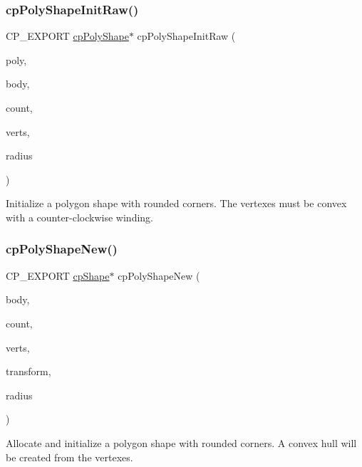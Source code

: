 \subsubsection{\texorpdfstring{cp\+Poly\+Shape\+Init\+Raw()}{cpPolyShapeInitRaw()}}
{\footnotesize\ttfamily C\+P\+\_\+\+E\+X\+P\+O\+RT \mbox{\hyperlink{structcp_poly_shape}{cp\+Poly\+Shape}}$\ast$ cp\+Poly\+Shape\+Init\+Raw (\begin{DoxyParamCaption}\item[{\mbox{\hyperlink{structcp_poly_shape}{cp\+Poly\+Shape}} $\ast$}]{poly,  }\item[{\mbox{\hyperlink{structcp_body}{cp\+Body}} $\ast$}]{body,  }\item[{int}]{count,  }\item[{const \mbox{\hyperlink{structcp_vect}{cp\+Vect}} $\ast$}]{verts,  }\item[{\mbox{\hyperlink{group__basic_types_gac1ed65573e035bf892505768c852d8d3}{cp\+Float}}}]{radius }\end{DoxyParamCaption})}

Initialize a polygon shape with rounded corners. The vertexes must be convex with a counter-\/clockwise winding. \mbox{\label{group__cp_poly_shape_ga4c25992d3d90362168b2681acd7d7d62}} 
\subsubsection{\texorpdfstring{cp\+Poly\+Shape\+New()}{cpPolyShapeNew()}}
{\footnotesize\ttfamily C\+P\+\_\+\+E\+X\+P\+O\+RT \mbox{\hyperlink{structcp_shape}{cp\+Shape}}$\ast$ cp\+Poly\+Shape\+New (\begin{DoxyParamCaption}\item[{\mbox{\hyperlink{structcp_body}{cp\+Body}} $\ast$}]{body,  }\item[{int}]{count,  }\item[{const \mbox{\hyperlink{structcp_vect}{cp\+Vect}} $\ast$}]{verts,  }\item[{\mbox{\hyperlink{structcp_transform}{cp\+Transform}}}]{transform,  }\item[{\mbox{\hyperlink{group__basic_types_gac1ed65573e035bf892505768c852d8d3}{cp\+Float}}}]{radius }\end{DoxyParamCaption})}

Allocate and initialize a polygon shape with rounded corners. A convex hull will be created from the vertexes. \mbox{\label{group__cp_poly_shape_ga5a63f33779a54ccc7b4dbff26576683e}} 

